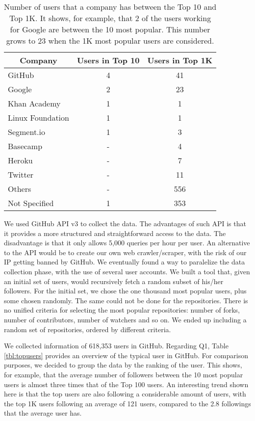 \begin{table}
\centering
\begin{tabular}{ | l | c | c | }
	\hline
	\multicolumn{1}{|c|}{Company} & Users in Top 10 & Users in Top 1K \\ \hline
	GitHub & 4 & 41 \\ \hline
	Google & 2 & 23 \\ \hline
	Khan Academy & 1 & 1 \\ \hline
	Linux Foundation & 1 & 1 \\ \hline
	Segment.io & 1 & 3 \\ \hline
	Basecamp & - & 4 \\ \hline
	Heroku & - & 7 \\ \hline
	Twitter & - & 11 \\ \hline
	Others & - & 556 \\ \hline
	Not Specified & 1 & 353 \\ \hline
\end{tabular}
\caption{Number of users that a company has between the Top 10 and Top 1K. It shows, for example, that 2 of the users working for Google are between the 10 most popular. This number grows to 23 when the 1K most popular users are considered.}
\label{tbl:topcompanies}
\end{table}

We used GitHub API v3 \cite{GitHubAPI} to collect the data. The advantages of such API is that it provides a more structured and straightforward access to the data. The disadvantage is that it only allows 5,000 queries per hour per user. An alternative to the API would be to create our own web crawler/scraper, with the risk of our IP getting banned by GitHub. We eventually found a way to paralelize the data collection phase, with the use of several user accounts. We built a tool that, given an initial set of users, would recursively fetch a random subset of his/her followers. For the initial set, we chose the one thousand most popular users, plus some chosen randomly. The same could not be done for the repositories. There is no unified criteria for selecting the most popular repositories: number of forks, number of contributors, number of watchers and so on. We ended up including a random set of repositories, ordered by different criteria.

We collected information of 618,353 users in GitHub. Regarding Q1, Table \ref{tbl:topusers} provides an overview of the typical user in GitHub. For comparison purposes, we decided to group the data by the ranking of the user. This shows, for example, that the average number of followers between the 10 most popular users is almost three times that of the Top 100 users. An interesting trend shown here is that the top users are also following a considerable amount of users, with the top 1K users following an average of 121 users, compared to the 2.8 followings that the average user has.


